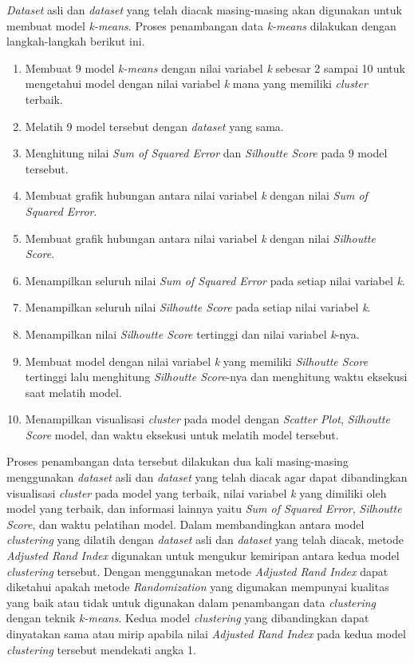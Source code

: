 \textit{Dataset} asli dan \textit{dataset} yang telah diacak masing-masing akan digunakan untuk membuat model \textit{k-means}. Proses penambangan data \textit{k-means} dilakukan dengan langkah-langkah berikut ini.
\begin{enumerate}
    \item Membuat 9 model \textit{k-means} dengan nilai variabel \textit{k} sebesar 2 sampai 10 untuk mengetahui model dengan nilai variabel \textit{k} mana yang memiliki \textit{cluster} terbaik.
    \item Melatih 9 model tersebut dengan \textit{dataset} yang sama.
    \item Menghitung nilai \textit{Sum of Squared Error} dan \textit{Silhoutte Score} pada 9 model tersebut.
    \item Membuat grafik hubungan antara nilai variabel \textit{k} dengan nilai \textit{Sum of Squared Error}.
    \item Membuat grafik hubungan antara nilai variabel \textit{k} dengan nilai \textit{Silhoutte Score}.
    \item Menampilkan seluruh nilai \textit{Sum of Squared Error} pada setiap nilai variabel \textit{k}.
    \item Menampilkan seluruh nilai \textit{Silhoutte Score} pada setiap nilai variabel \textit{k}.
    \item Menampilkan nilai \textit{Silhoutte Score} tertinggi dan nilai variabel \textit{k}-nya.
    \item Membuat model dengan nilai variabel \textit{k} yang memiliki \textit{Silhoutte Score} tertinggi lalu menghitung \textit{Silhoutte Score}-nya dan menghitung waktu eksekusi saat melatih model.
    \item Menampilkan visualisasi \textit{cluster} pada model dengan \textit{Scatter Plot}, \textit{Silhoutte Score} model, dan waktu eksekusi untuk melatih model tersebut.
\end{enumerate}
Proses penambangan data tersebut dilakukan dua kali masing-masing menggunakan \textit{dataset} asli dan \textit{dataset} yang telah diacak agar dapat dibandingkan visualisasi \textit{cluster} pada model yang terbaik, nilai variabel \textit{k} yang dimiliki oleh model yang terbaik, dan informasi lainnya yaitu \textit{Sum of Squared Error}, \textit{Silhoutte Score}, dan waktu pelatihan model. Dalam membandingkan antara model \textit{clustering} yang dilatih dengan \textit{dataset} asli dan \textit{dataset} yang telah diacak, metode \textit{Adjusted Rand Index} digunakan untuk mengukur kemiripan antara kedua model \textit{clustering} tersebut. Dengan menggunakan metode \textit{Adjusted Rand Index} dapat diketahui apakah metode \textit{Randomization} yang digunakan mempunyai kualitas yang baik atau tidak untuk digunakan dalam penambangan data \textit{clustering} dengan teknik \textit{k-means}. Kedua model \textit{clustering} yang dibandingkan dapat dinyatakan sama atau mirip apabila nilai \textit{Adjusted Rand Index} pada kedua model \textit{clustering} tersebut mendekati angka 1.

